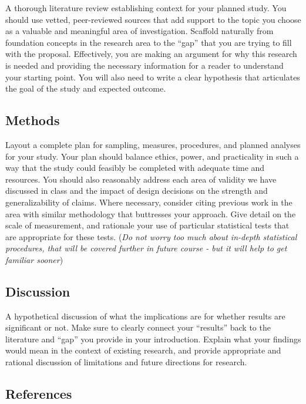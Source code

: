 \documentclass[
  12pt,
  letterpaper,
]{scrartcl}
\begin{document}
A thorough literature review establishing context for your planned
study. You should use vetted, peer-reviewed sources that add support to
the topic you choose as a valuable and meaningful area of investigation.
Scaffold naturally from foundation concepts in the research area to the
``gap'' that you are trying to fill with the proposal. Effectively, you
are making an argument for why this research is needed and providing the
necessary information for a reader to understand your starting point.
You will also need to write a clear hypothesis that articulates the goal
of the study and expected outcome.

\subsection{Methods}\label{methods}

Layout a complete plan for sampling, measures, procedures, and planned
analyses for your study. Your plan should balance ethics, power, and
practicality in such a way that the study could feasibly be completed
with adequate time and resources. You should also reasonably address
each area of validity we have discussed in class and the impact of
design decisions on the strength and generalizability of claims. Where
necessary, consider citing previous work in the area with similar
methodology that buttresses your approach. Give detail on the scale of
measurement, and rationale your use of particular statistical tests that
are appropriate for these tests. (\emph{Do not worry too much about
in-depth statistical procedures, that will be covered further in future
course - but it will help to get familiar sooner})

\subsection{Discussion}\label{discussion}

A hypothetical discussion of what the implications are for whether
results are significant or not. Make sure to clearly connect your
``results'' back to the literature and ``gap'' you provide in your
introduction. Explain what your findings would mean in the context of
existing research, and provide appropriate and rational discussion of
limitations and future directions for research.

\subsection{References}\label{references}
\end{document}
